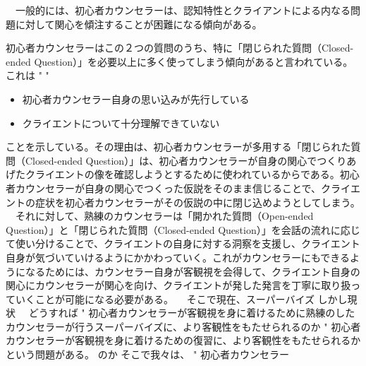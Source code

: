 \documentclass[shuuron]{kuee}
\begin{document}
　一般的には、初心者カウンセラーは、認知特性とクライアントによる内なる問題に対して関心を傾注することが困難になる傾向がある。

初心者カウンセラーはこの２つの質問のうち、特に「閉じられた質問（Closed-ended Question）」を必要以上に多く使ってしまう傾向があると言われている。これは
"
"
\begin{itemize}
\item 初心者カウンセラー自身の思い込みが先行している
\item クライエントについて十分理解できていない
\end{itemize}
ことを示している。その理由は、初心者カウンセラーが多用する「閉じられた質問（Closed-ended Question）」は、初心者カウンセラーが自身の関心でつくりあげたクライエントの像を確認しようとするために使われているからである。初心者カウンセラーが自身の関心でつくった仮説をそのまま信じることで、クライエントの症状を初心者カウンセラーがその仮説の中に閉じ込めようとしてしまう。
　それに対して、熟練のカウンセラーは「開かれた質問（Open-ended Question）」と「閉じられた質問（Closed-ended Question）」を会話の流れに応じて使い分けることで、クライエントの自身に対する洞察を支援し、クライエント自身が気づいていけるようにかかわっていく。これがカウンセラーにもできるようになるためには、カウンセラー自身が客観視を会得して、クライエント自身の関心にカウンセラーが関心を向け、クライエントが発した発言を丁寧に取り扱っていくことが可能になる必要がある。
　そこで現在、スーパーバイズ
しかし現状　
どうすれば
"	初心者カウンセラーが客観視を身に着けるために熟練のしたカウンセラーが行うスーパーバイズに、より客観性をもたせられるのか
"	初心者カウンセラーが客観視を身に着けるための復習に、より客観性をもたせられるか
という問題がある。
のか
そこで我々は、
"	初心者カウンセラー
\end{document}
